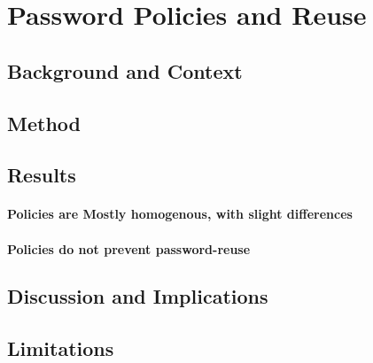 \chapter[Password Policies and Reuse]{Password Policies and Reuse}\label{chap:policies-reuse}
\section{Background and Context}
\section{Method}

\section{Results}
\subsubsection{Policies are Mostly homogenous, with slight differences}
\subsubsection{Policies do not prevent password-reuse}

\section{Discussion and Implications}

\section{Limitations}
